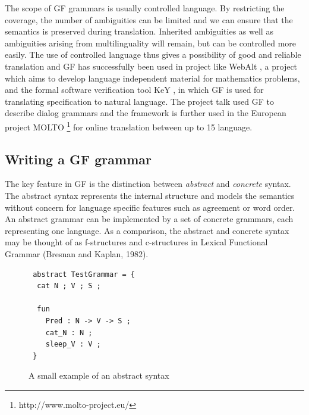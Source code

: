 \documentclass{report}
\begin{document}
\newpage %
The scope of GF grammars is usually controlled language. By
restricting the coverage, the number of ambiguities
can be limited and we can ensure that the semantics is preserved during
translation. Inherited ambiguities as well as ambiguities arising from multilinguality will
remain, but can be controlled more easily. %
The use of controlled language thus gives a possibility of good and reliable translation
and GF has successfully been used in project like %
WebAlt \cite{webalt}, a project which aims to develop language independent
material for mathematics problems, and the formal software verification tool
KeY \cite{key}, in which GF is used for translating specification to natural language.
The project talk \cite{talk} used GF to describe dialog grammars and
the framework is further used in the
European project MOLTO \footnote{http://www.molto-project.eu/} for online
translation between up to 15 language.\\


\subsection{Writing a GF grammar}
\label{sec:writegf}
The key feature in GF is the distinction between
\textit{abstract} and \textit{concrete} syntax. The abstract syntax represents
the internal structure and models the semantics without concern for language
specific features such as agreement or word order.
An abstract grammar can be implemented by a set of concrete grammars, each
representing one language. As a comparison, the abstract and concrete syntax
may be thought of as f-structures and c-structures in Lexical Functional
Grammar (Bresnan and Kaplan, 1982).

\begin{figure}[h]
\begin{verbatim}
 abstract TestGrammar = {
  cat N ; V ; S ;

  fun 
    Pred : N -> V -> S ;
    cat_N : N ;
    sleep_V : V ;
 }
\end{verbatim}
\caption{A small example of an abstract syntax}
\label{fig:gfAbstract1}
\end{figure}
\end{document}
